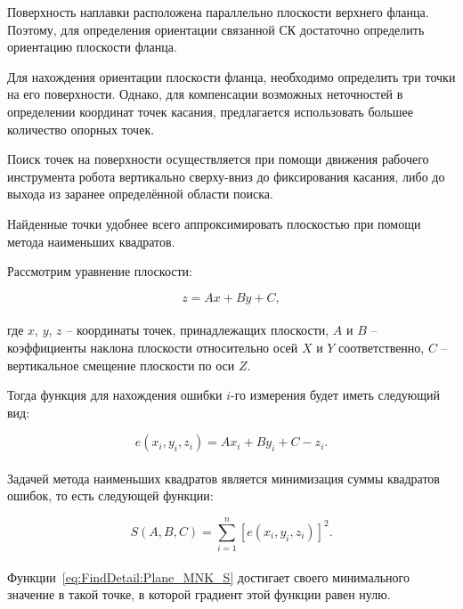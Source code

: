 Поверхность наплавки расположена параллельно плоскости верхнего фланца.
Поэтому, для определения ориентации связанной СК достаточно определить ориентацию плоскости фланца.

Для нахождения ориентации плоскости фланца, необходимо определить три точки на его поверхности.
Однако, для компенсации возможных неточностей в определении координат точек касания, предлагается использовать большее количество опорных точек.

Поиск точек на поверхности осуществляется при помощи движения рабочего инструмента робота вертикально сверху-вниз до фиксирования касания, либо до выхода из заранее определённой области поиска.

Найденные точки удобнее всего аппроксимировать плоскостью при помощи метода наименьших квадратов.

Рассмотрим уравнение плоскости:

\begin{equation}
    \label{eq:FindDetail:Plane}
    z = A x + B y + C,
\end{equation} \\
где $x$, $y$, $z$ -- координаты точек, принадлежащих плоскости, $A$ и $B$ -- коэффициенты наклона плоскости относительно осей $X$ и $Y$ соответственно, $C$ -- вертикальное смещение плоскости по оси $Z$.

Тогда функция для нахождения ошибки $i$-го измерения будет иметь следующий вид:

\begin{equation}
    \label{eq:FindDetail:Plane_MNK_e}
    e(x_i, y_i, z_i) = A x_i + B y_i + C - z_i.
\end{equation} \\

Задачей метода наименьших квадратов является минимизация суммы квадратов ошибок, то есть следующей функции:

\begin{equation}
    \label{eq:FindDetail:Plane_MNK_S}
    S(A, B, C) = \sum_{i=1}^{n} \left[ e(x_i, y_i, z_i) \right]^2.
\end{equation} \\

Функции~\ref{eq:FindDetail:Plane_MNK_S} достигает своего минимального значение в такой точке, в которой градиент этой функции равен нулю.

